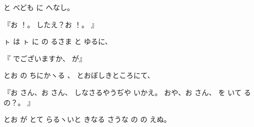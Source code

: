 と
べども
に
へなし。

『お
！。
したえ？お
！。
』

ㇳ
は
ㇳ
に
の
るさま
と
ゆるに、

『
でございますか、
が』

とお
の
ちにかヽる
、
とおぼしきところにて、

『お
さん、お
さん、
しなさるやうぢや
いかえ。
おや、お
さん、
を
いて
るの？。
』

とお
が
とて
らるヽいと
きなる
さうな
の
の
えぬ。

